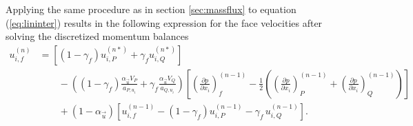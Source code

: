   Applying the same procedure as in section \ref{sec:massflux} to equation (\ref{eq:lininter}) results in the following expression for the face velocities after solving the discretized momentum balances
  \begin{align}
    \label{eq:faceinter}
    u_{i,f}^{(n)} 
    &=
    \left[\left(1 - \gamma_f\right) u_{i,P}^{(n*)} + \gamma_f u_{i,Q}^{(n*)} \right] \nonumber\\[1em]
    &\quad\quad - 
    \left(\left(1 - \gamma_f\right) \frac{\alpha_\vec{u} V_P}{a_{P,u_i}} + \gamma_f \frac{\alpha_\vec{u} V_Q}{a_{Q,u_i}}\right)
    \left[ 
    \left(\frac{\partial p}{\partial x_i}\right)_f^{(n-1)} 
    - \frac{1}{2} \left( \left( \frac{\partial p}{\partial x_i} \right)_P^{(n-1)} 
    + \left(\frac{\partial p}{\partial x_i}\right)_Q^{(n-1)} \right)
    \right] \nonumber \\[1em]
    &\quad\quad + \left(1 - \alpha_\vec{u}\right) \left[ u_{i,f}^{(n-1)} - \left(1 - \gamma_f\right) u_{i,P}^{(n-1)} - \gamma_f \, u_{i,Q}^{(n-1)} \right].
  \end{align}

